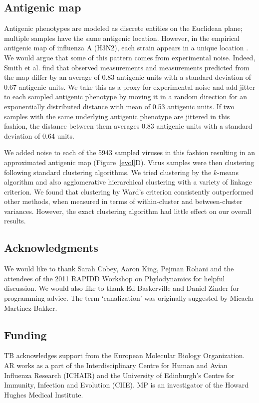 \documentclass[11pt,oneside,letterpaper]{article}
\begin{document}
\subsection*{Antigenic map}

Antigenic phenotypes are modeled as discrete entities on the Euclidean plane; multiple samples have the same antigenic location.  However, in the empirical antigenic map of influenza A (H3N2), each strain appears in a unique location \cite{Smith04}.  We would argue that some of this pattern comes from experimental noise.  Indeed, Smith et al. \cite{Smith04} find that observed measurements and measurements predicted from the map differ by an average of 0.83 antigenic units with a standard deviation of 0.67 antigenic units.  We take this as a proxy for experimental noise and add jitter to each sampled antigenic phenotype by moving it in a random direction for an exponentially distributed distance with mean of 0.53 antigenic units.  If two samples with the same underlying antigenic phenotype are jittered in this fashion, the distance between them averages 0.83 antigenic units with a standard deviation of 0.64 units.

We added noise to each of the 5943 sampled viruses in this fashion resulting in an approximated antigenic map (Figure~\ref{evol}D).  Virus samples were then clustering following standard clustering algorithms.  We tried clustering by the $k$-means algorithm and also agglomerative hierarchical clustering with a variety of linkage criterion.  We found that clustering by Ward's criterion consistently outperformed other methods, when measured in terms of within-cluster and between-cluster variances.  However, the exact clustering algorithm had little effect on our overall results.

\subsection*{Acknowledgments} 
We would like to thank Sarah Cobey, Aaron King, Pejman Rohani and the attendees of the 2011 RAPIDD Workshop on Phylodynamics for helpful discussion.  We would also like to thank Ed Baskerville and Daniel Zinder for programming advice.  The term `canalization' was originally suggested by Micaela Martinez-Bakker. 

\subsection*{Funding} 
TB acknowledges support from the European Molecular Biology Organization.  AR works as a part of the Interdisciplinary Centre for Human and Avian Influenza Research (ICHAIR) and the University of Edinburgh's Centre for Immunity, Infection and Evolution (CIIE).  MP is an investigator of the Howard Hughes Medical Institute.  
\end{document}
